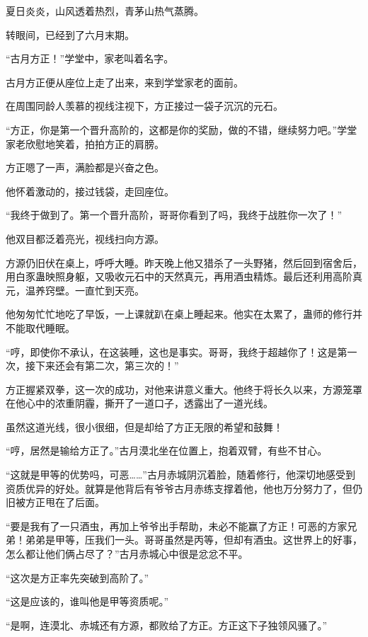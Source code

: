 
\begin{this_body}

夏日炎炎，山风透着热烈，青茅山热气蒸腾。

转眼间，已经到了六月末期。

“古月方正！”学堂中，家老叫着名字。

古月方正便从座位上走了出来，来到学堂家老的面前。

在周围同龄人羡慕的视线注视下，方正接过一袋子沉沉的元石。

“方正，你是第一个晋升高阶的，这都是你的奖励，做的不错，继续努力吧。”学堂家老欣慰地笑着，拍拍方正的肩膀。

方正嗯了一声，满脸都是兴奋之色。

他怀着激动的，接过钱袋，走回座位。

“我终于做到了。第一个晋升高阶，哥哥你看到了吗，我终于战胜你一次了！”

他双目都泛着亮光，视线扫向方源。

方源仍旧伏在桌上，呼呼大睡。昨天晚上他又猎杀了一头野猪，然后回到宿舍后，用白豕蛊映照身躯，又吸收元石中的天然真元，再用酒虫精炼。最后还利用高阶真元，温养窍壁。一直忙到天亮。

他匆匆忙忙地吃了早饭，一上课就趴在桌上睡起来。他实在太累了，蛊师的修行并不能取代睡眠。

“哼，即使你不承认，在这装睡，这也是事实。哥哥，我终于超越你了！这是第一次，接下来还会有第二次，第三次的！”

方正握紧双拳，这一次的成功，对他来讲意义重大。他终于将长久以来，方源笼罩在他心中的浓重阴霾，撕开了一道口子，透露出了一道光线。

虽然这道光线，很小很细，但是却给了方正无限的希望和鼓舞！

“哼，居然是输给方正了。”古月漠北坐在位置上，抱着双臂，有些不甘心。

“这就是甲等的优势吗，可恶……”古月赤城阴沉着脸，随着修行，他深切地感受到资质优异的好处。就算是他背后有爷爷古月赤练支撑着他，他也万分努力了，但仍旧被方正甩在了后面。

“要是我有了一只酒虫，再加上爷爷出手帮助，未必不能赢了方正！可恶的方家兄弟！弟弟是甲等，压我们一头。哥哥虽然是丙等，但却有酒虫。这世界上的好事，怎么都让他们俩占尽了？”古月赤城心中很是忿忿不平。

“这次是方正率先突破到高阶了。”

“这是应该的，谁叫他是甲等资质呢。”

“是啊，连漠北、赤城还有方源，都败给了方正。方正这下子独领风骚了。”


\end{this_body}

